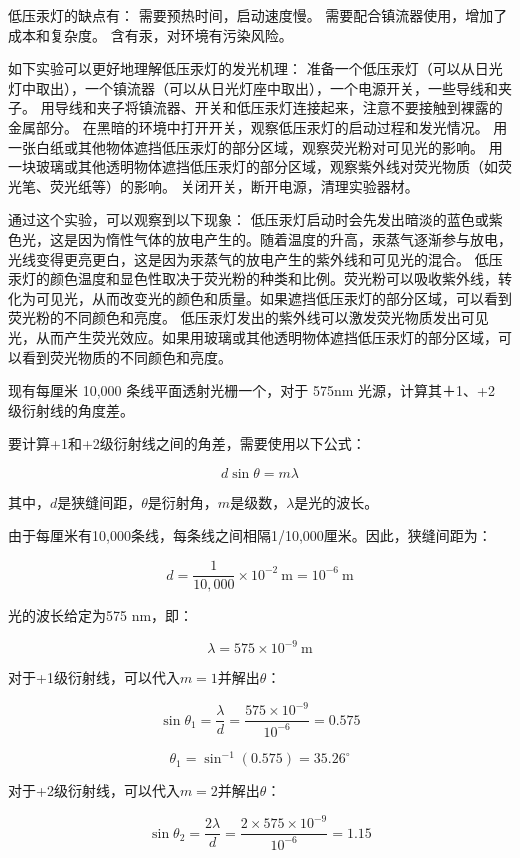 \documentclass[dvipsnames, svgnames,a4paper,11pt]{article}
\begin{document}
	低压汞灯的缺点有：	
	需要预热时间，启动速度慢。
	需要配合镇流器使用，增加了成本和复杂度。
	含有汞，对环境有污染风险。
	
	如下实验可以更好地理解低压汞灯的发光机理：	
	准备一个低压汞灯（可以从日光灯中取出），一个镇流器（可以从日光灯座中取出），一个电源开关，一些导线和夹子。
	用导线和夹子将镇流器、开关和低压汞灯连接起来，注意不要接触到裸露的金属部分。
	在黑暗的环境中打开开关，观察低压汞灯的启动过程和发光情况。
	用一张白纸或其他物体遮挡低压汞灯的部分区域，观察荧光粉对可见光的影响。
	用一块玻璃或其他透明物体遮挡低压汞灯的部分区域，观察紫外线对荧光物质（如荧光笔、荧光纸等）的影响。
	关闭开关，断开电源，清理实验器材。
	
	通过这个实验，可以观察到以下现象：	
	低压汞灯启动时会先发出暗淡的蓝色或紫色光，这是因为惰性气体的放电产生的。随着温度的升高，汞蒸气逐渐参与放电，光线变得更亮更白，这是因为汞蒸气的放电产生的紫外线和可见光的混合。
	低压汞灯的颜色温度和显色性取决于荧光粉的种类和比例。荧光粉可以吸收紫外线，转化为可见光，从而改变光的颜色和质量。如果遮挡低压汞灯的部分区域，可以看到荧光粉的不同颜色和亮度。
	低压汞灯发出的紫外线可以激发荧光物质发出可见光，从而产生荧光效应。如果用玻璃或其他透明物体遮挡低压汞灯的部分区域，可以看到荧光物质的不同颜色和亮度。
	
	\begin{question}
		现有每厘米 10,000 条线平面透射光栅一个，对于 575nm 光源，计算其＋1、+2 级衍射线的角度差。
	\end{question}
	要计算+1和+2级衍射线之间的角差，需要使用以下公式：
	
	\[
	d \sin \theta = m \lambda
	\]
	
	其中，\(d\)是狭缝间距，\(\theta\)是衍射角，\(m\)是级数，\(\lambda\)是光的波长。
	
	由于每厘米有10,000条线，每条线之间相隔1/10,000厘米。因此，狭缝间距为：
	
	\[
	d = \frac{1}{10,000} \times 10^{-2} \ \text{m} = 10^{-6} \ \text{m}
	\]
	
	光的波长给定为575 nm，即：
	
	\[
	\lambda = 575 \times 10^{-9} \ \text{m}
	\]
	
	对于+1级衍射线，可以代入\(m=1\)并解出\(\theta\)：
	
	\[
	\sin \theta_1 = \frac{\lambda}{d} = \frac{575 \times 10^{-9}}{10^{-6}} = 0.575
	\]
	
	\[
	\theta_1 = \sin^{-1}(0.575) = 35.26^{\circ}
	\]
	
	对于+2级衍射线，可以代入\(m=2\)并解出\(\theta\)：
	
	\[
	\sin \theta_2 = \frac{2\lambda}{d} = \frac{2 \times 575 \times 10^{-9}}{10^{-6}} = 1.15
	\]
	
\end{document}
